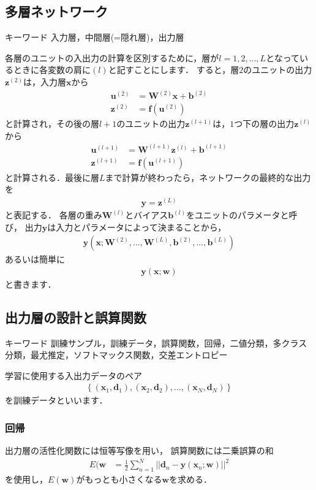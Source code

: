 \documentclass[a4paper,10pt]{jsarticle}
\theoremstyle{definition}
\newcommand{\eq}[1]{\begin{align}#1\end{align}}
\begin{document}
\subsection{多層ネットワーク}
\begin{itembox}[l]{キーワード}
入力層，中間層(=隠れ層)，出力層
\end{itembox}
各層のユニットの入出力の計算を区別するために，層が$l=1,2,...,L$となっているときに各変数の肩に$(l)$と記すことにします．
すると，層$2$のユニットの出力$\mathbf{z}^{(2)}$は，入力層$\mathbf{x}$から
\eq{
	\mathbf{u}^{(2)}&=\mathbf{W}^{(2)}\mathbf{x}+\mathbf{b}^{(2)}\\
	\mathbf{z}^{(2)}&=\mathbf{f}(\mathbf{u}^{(2)})}
と計算され，その後の層$l+1$のユニットの出力$\mathbf{z}^{(l+1)}$は，$1$つ下の層の出力$\mathbf{z}^{(l)}$から
\eq{
	\mathbf{u}^{(l+1)}&=\mathbf{W}^{(l+1)}\mathbf{z}^{(l)}+\mathbf{b}^{(l+1)}\\
	\mathbf{z}^{(l+1)}&=\mathbf{f}(\mathbf{u}^{(l+1)})}
と計算される．最後に層$L$まで計算が終わったら，ネットワークの最終的な出力を
\eq{\mathbf{y}=\mathbf{z}^{(L)}}
と表記する．
各層の重み$\mathbf{W}^{(l)}$とバイアス$\mathbf{b}^{(l)}$をユニットのパラメータと呼び，
出力$\mathbf{y}$は入力とパラメータによって決まることから，
\eq{\mathbf{y}\left(\mathbf{x};\mathbf{W}^{(2)},...,\mathbf{W}^{(L)},\mathbf{b}^{(2)},...,\mathbf{b}^{(L)}\right)}
あるいは簡単に
\eq{\mathbf{y}(\mathbf{x};\mathbf{w})}
と書きます．
%
\subsection{出力層の設計と誤算関数}
\begin{itembox}[l]{キーワード}
訓練サンプル，訓練データ，誤算関数，回帰，二値分類，多クラス分類，最尤推定，ソフトマックス関数，交差エントロピー
\end{itembox}
学習に使用する入出力データのペア
\eq{\left\{(\mathbf{x}_1,\mathbf{d}_1),(\mathbf{x}_2,\mathbf{d}_2),...,(\mathbf{x}_N,\mathbf{d}_N)\right\}}
を訓練データといいます．
%
\subsubsection{回帰}
出力層の活性化関数には恒等写像を用い，
誤算関数には二乗誤算の和
\eq{E(\mathbf{w}&=\frac{1}{2}\sum_{n=1}^N||\mathbf{d}_n-\mathbf{y}(\mathbf{x}_n;\mathbf{w})||^2}
を使用し，$E(\mathbf{w})$がもっとも小さくなる$\mathbf{w}$を求める．
%
\end{document}
